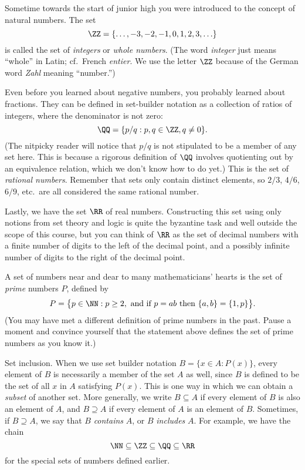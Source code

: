 Sometime towards the start of junior high you were introduced to the concept of natural numbers. The set
$$\ZZ=\{ \ldots, -3, -2, -1, 0, 1, 2, 3, \ldots\}$$
is called the set of {\it integers} or {\it whole numbers}.
(The word {\it integer} just means ``whole'' in Latin; cf.~French {\it entier}. We use the letter $\ZZ$
because of the German word {\it Zahl} meaning ``number.'')

Even before you learned about negative numbers, you probably learned about fractions. They can be defined
in set-builder notation as a collection of ratios of integers, where the denominator is not zero:
$$\QQ = \{ p/q : p, q\in \ZZ, q\ne 0\}.$$
(The nitpicky reader will notice that $p/q$ is not stipulated to be a member of any set here. This is because
a rigorous definition of $\QQ$ involves quotienting out by an equivalence relation, which we don't know how to
do yet.)
This is the set of {\it rational numbers}.
Remember that sets only contain distinct elements, so $2/3$, $4/6$, $6/9$, etc.~are all considered the
same rational number.

Lastly, we have the set $\RR$ of real numbers. Constructing this set using only notions from set theory
and logic is quite the byzantine task and well outside the scope of this course, but you can think of
$\RR$ as the set of decimal numbers with a finite number of digits to the left of the decimal point, and
a possibly infinite number of digits to the right of the decimal point.

A set of numbers near and dear to many mathematicians' hearts is the set of {\it prime} numbers $P$,
defined by
$$P = \bigl\{ p\in \NN : p\ge 2,\ \hbox{and if $p = ab$ then $\{a,b\} = \{1,p\}$}\bigr\}.$$
(You may have met a different definition of prime numbers in the past. Pause a moment and convince
yourself that the statement above defines the set of prime numbers as you know it.)
\endgroup%

\medskip\boldlabel Set inclusion.
When we use set builder notation $B = \bigl\{x\in A : P(x)\bigr\}$, every element of $B$ is necessarily
a member of the set $A$ as well, since $B$ is defined to be the set of all $x$ in $A$ satisfying
$P(x)$. This is one way in which we can obtain
a {\it subset} of another set. More generally, we write $B\subseteq A$ if every element of $B$ is also
an element of $A$, and $B\supseteq A$ if every element of $A$ is an element of $B$. Sometimes, if $B\supseteq A$,
we say that $B$ {\it contains} $A$, or $B$ {\it includes} $A$. For example, we have the chain
$$\NN\subseteq \ZZ \subseteq \QQ\subseteq \RR$$
for the special sets of numbers defined earlier.

